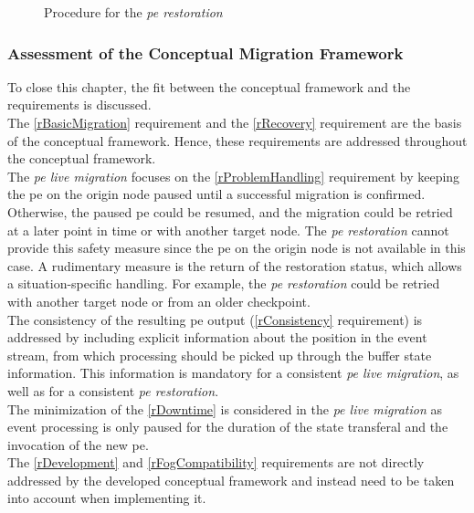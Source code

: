 \begin{figure}[!ht]
\graphicspath{{./figures/code/}}

\caption{Procedure for the \textit{\acrshort{pe} restoration}}
\label{fOSR}
\end{figure}

\subsubsection{Assessment of the Conceptual Migration Framework}
\label{lEvaluationOfMigrationConcept}
To close this chapter, the fit between the conceptual framework and the requirements is discussed.\\
The \ref{rBasicMigration} requirement and the \ref{rRecovery} requirement are the basis of the conceptual framework. Hence, these requirements are addressed throughout the conceptual framework.\\
The \textit{\acrshort{pe} live migration} focuses on the \ref{rProblemHandling} requirement by keeping the \gls{pe} on the origin node paused until a successful migration is confirmed. Otherwise, the paused \gls{pe} could be resumed, and the migration could be retried at a later point in time or with another target node. The \textit{\acrshort{pe} restoration} cannot provide this safety measure since the \gls{pe} on the origin node is not available in this case. A rudimentary measure is the return of the restoration status, which allows a situation-specific handling. For example, the \textit{\acrshort{pe} restoration} could be retried with another target node or from an older checkpoint.\\
The consistency of the resulting \gls{pe} output (\ref{rConsistency} requirement) is addressed by including explicit information about the position in the event stream, from which processing should be picked up through the buffer state information. This information is mandatory for a consistent \textit{\acrshort{pe} live migration}, as well as for a consistent \textit{\acrshort{pe} restoration}.\\
The minimization of the \ref{rDowntime} is considered in the \textit{\acrshort{pe} live migration} as event processing is only paused for the duration of the state transferal and the invocation of the new \gls{pe}.\\
The \ref{rDevelopment} and \ref{rFogCompatibility} requirements are not directly addressed by the developed conceptual framework and instead need to be taken into account when implementing it.
